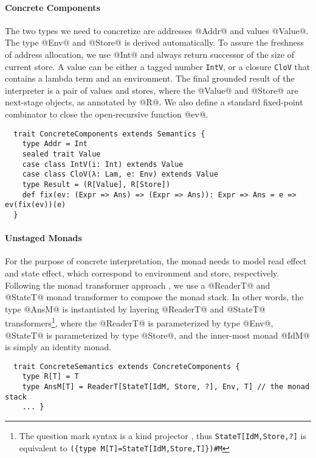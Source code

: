 \paragraph{Concrete Components}
The two types we need to concretize are addresses @Addr@ and values @Value@. The
type @Env@ and @Store@ is derived automatically. To assure the freshness of
address allocation, we use @Int@ and always return successor of the size of
current store. A value can be either a tagged number \texttt{IntV}, or a closure
\texttt{CloV} that contains a lambda term and an environment. The final grounded
result of the interpreter is a pair of values and stores, where the @Value@ and
@Store@ are next-stage objects, as annotated by @R@. We also define a standard
fixed-point combinator to close the open-recursive function @ev@.
\begin{lstlisting}
  trait ConcreteComponents extends Semantics {
    type Addr = Int
    sealed trait Value
    case class IntV(i: Int) extends Value
    case class CloV(λ: Lam, e: Env) extends Value
    type Result = (R[Value], R[Store])
    def fix(ev: (Expr => Ans) => (Expr => Ans)): Expr => Ans = e => ev(fix(ev))(e)
  }
\end{lstlisting}

\paragraph{Unstaged Monads}
For the purpose of concrete interpretation, the monad needs to model read
effect and state effect, which correspond to environment and store,
respectively. Following the monad transformer approach
\cite{DBLP:conf/popl/LiangHJ95}, we use a @ReaderT@ and @StateT@ monad
transformer to compose the monad stack. In other words, the type @AnsM@ is
instantiated by layering @ReaderT@ and @StateT@ transformers\footnote{The
question mark syntax is a kind projector \cite{kindprojector}, thus
\texttt{StateT[IdM,Store,?]} is equivalent to \newline \texttt{(\{type
M[T]=StateT[IdM,Store,T]\})\#M}}, where the @ReaderT@ is parameterized by type
@Env@, @StateT@ is parameterized by type @Store@, and the inner-most monad @IdM@
is simply an identity monad.
\begin{lstlisting}
  trait ConcreteSemantics extends ConcreteComponents {
    type R[T] = T
    type AnsM[T] = ReaderT[StateT[IdM, Store, ?], Env, T] // the monad stack
    ... }
\end{lstlisting}

